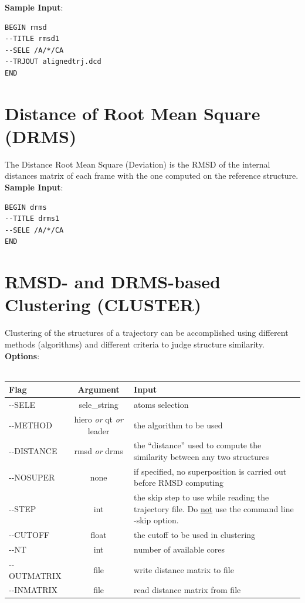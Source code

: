 \documentclass[11pt,twoside,onecolumn,a4paper,openright,notitlepage]{book}[2001/04/21]
\begin{document}
\textbf{\large Sample Input}:
\begin{verbatim}
BEGIN rmsd
--TITLE rmsd1
--SELE /A/*/CA
--TRJOUT alignedtrj.dcd
END
\end{verbatim}
\clearpage

\section{Distance of Root Mean Square (DRMS)}
The Distance Root Mean Square (Deviation) is the RMSD of the internal distances matrix of each frame with the one computed on the reference structure.\\

\textbf{\large Sample Input}:
\begin{verbatim}
BEGIN drms
--TITLE drms1
--SELE /A/*/CA
END
\end{verbatim}
\clearpage

\section{RMSD- and DRMS-based Clustering (CLUSTER)}
Clustering of the structures of a trajectory can be accomplished using different methods (algorithms) and different criteria to judge structure similarity.\\

\textbf{\large Options}:\\\\
\begin{tabular}{l|c|p{7.5cm}}
Flag & Argument & Input \\
\hline
-{}-SELE          & sele\_string  & atoms selection\\
-{}-METHOD        & hiero \emph{or} qt \emph{or} leader  & the algorithm to be used\\
-{}-DISTANCE      & rmsd \emph{or} drms    & the ``distance'' used to compute the similarity between any two structures\\
-{}-NOSUPER       & none          & if specified, no superposition is carried out before RMSD computing\\
-{}-STEP          & int           & the skip step to use while reading the trajectory file. Do \underline{not} use the command line -skip option.\\
-{}-CUTOFF        & float         & the cutoff to be used in clustering\\
-{}-NT            & int           & number of available cores\\ 
-{}-OUTMATRIX	  & file     	  & write distance matrix to file\\
-{}-INMATRIX	  & file     	  & read distance matrix from file\\
\end{tabular}\\\\
\end{document}

